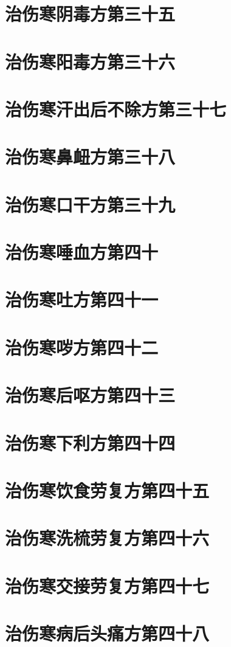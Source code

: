 \documentclass[a4paper,12pt,UTF8,twoside]{ctexbook}
\begin{document}
\chapter{治伤寒阴毒方第三十五}
\chapter{治伤寒阳毒方第三十六}
\chapter{治伤寒汗出后不除方第三十七}
\chapter{治伤寒鼻衄方第三十八}
\chapter{治伤寒口干方第三十九}
\chapter{治伤寒唾血方第四十}
\chapter{治伤寒吐方第四十一}
\chapter{治伤寒哕方第四十二}
\chapter{治伤寒后呕方第四十三}
\chapter{治伤寒下利方第四十四}
\chapter{治伤寒饮食劳复方第四十五}
\chapter{治伤寒洗梳劳复方第四十六}
\chapter{治伤寒交接劳复方第四十七}
\chapter{治伤寒病后头痛方第四十八}
\end{document}
